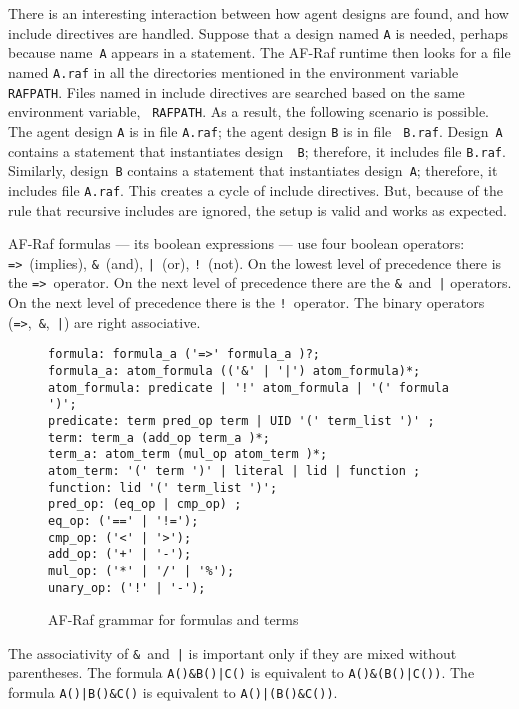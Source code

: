 \documentclass[a4paper,12pt,oneside,fleqn]{book} %
\begin{document}
There is an interesting interaction between how agent designs are found,
and how include directives are handled. Suppose that a design named {\tt A}
is needed, perhaps because name~{\tt A} appears in a statement. The AF-Raf
runtime then looks for a file named {\tt A.raf} in all the directories
mentioned in the environment variable {\tt RAFPATH}. Files named in include
directives are searched based on the same environment variable, {\tt
RAFPATH}. As a result, the following scenario is possible. The agent design
{\tt A} is in file {\tt A.raf}; the agent design {\tt B} is in file {\tt
B.raf}. Design~{\tt A} contains a statement that instantiates design~{\tt
B}; therefore, it includes file {\tt B.raf}. Similarly, design~{\tt B}
contains a statement that instantiates design~{\tt A}; therefore, it
includes file {\tt A.raf}. This creates a cycle of include directives.
But, because of the rule that recursive includes are ignored, the setup is
valid and works as expected.

AF-Raf formulas --- its boolean expressions --- use four boolean operators:
\verb+=>+~(implies), \verb+&+~(and), \verb+|+~(or), \verb+!+~(not).  On the
lowest level of precedence there is the \verb+=>+~operator.  On the next
level of precedence there are the \verb+&+~and~\verb+|+ operators. On the
next level of precedence there is the \verb+!+~operator.  The binary
operators (\verb+=>+,~\verb+&+,~\verb+|+) are right associative.

\begin{figure}\footnotesize %
\begin{verbatim}
formula: formula_a ('=>' formula_a )?;
formula_a: atom_formula (('&' | '|') atom_formula)*;
atom_formula: predicate | '!' atom_formula | '(' formula ')';
predicate: term pred_op term | UID '(' term_list ')' ;
term: term_a (add_op term_a )*;
term_a: atom_term (mul_op atom_term )*;
atom_term: '(' term ')' | literal | lid | function ;
function: lid '(' term_list ')';
pred_op: (eq_op | cmp_op) ;
eq_op: ('==' | '!=');
cmp_op: ('<' | '>'); 
add_op: ('+' | '-');
mul_op: ('*' | '/' | '%');
unary_op: ('!' | '-'); 
\end{verbatim}
\caption{AF-Raf grammar for formulas and terms}
\label{fig:grammar-expr}
\end{figure} %

\begin{example}
The associativity of \verb+&+~and~\verb+|+ is important only if they are
mixed without parentheses.  The formula \verb+A()&B()|C()+ is equivalent to
\verb+A()&(B()|C())+.  The formula \verb+A()|B()&C()+ is equivalent to
\verb+A()|(B()&C())+.
\end{example}
\end{document}

